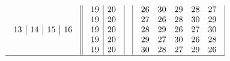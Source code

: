 \documentclass[12pt,a4paper]{amsart}
\begin{document}
\begin{align*}
\begin{array}{r||c|c|c|c}
\begin{array}{c|c|c|c}
13&14&15&16\\
    \end{array}
&
    \begin{array}{c|c}
      19&20\\
      19&20\\
      19&20\\
      19&20\\
      19&20\\
    \end{array}
&
&
\begin{array}{rrrrr}%
26&30&29&28&27\\%
27&26&28&30&29\\%
28&29&26&27&30\\%
29&27&30&26&28\\%
30&28&27&29&26\\%
\end{array}
\\\hline
  \end{array}
\end{align*}
\end{document}
